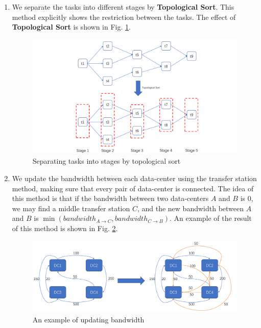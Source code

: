 \documentclass{llncs}
\begin{document}
\begin{enumerate}
    \item We separate the tasks into different stages by {\bf Topological Sort}. This method explicitly shows the restriction between the tasks. The effect of {\bf Topological Sort} is shown in Fig. \ref{fig:topological sort}.
    \begin{figure}
        \centering
        \includegraphics[width=15cm]{Figures/FigureDesign.pdf}
        \caption{Separating tasks into stages by topological sort}
        \label{fig:topological sort}
    \end{figure}
    \item We update the bandwidth between each data-center using the transfer station method, making sure that every pair of data-center is connected. The idea of this method is that if the bandwidth between two data-centers $A$ and $B$ is $0$, we may find a middle transfer station $C$, and the new bandwidth between $A$ and $B$ is $\min \left( bandwidth_{A\rightarrow C},bandwidth_{C\rightarrow B} \right) $. An example of the result of this method is shown in Fig. \ref{fig:transfer station}.
    \begin{figure}
        \centering
        \includegraphics[width=15cm]{Figures/transfer_station.pdf}
        \caption{An example of updating bandwidth}
        \label{fig:transfer station}
    \end{figure}
\end{enumerate}
\end{document}
